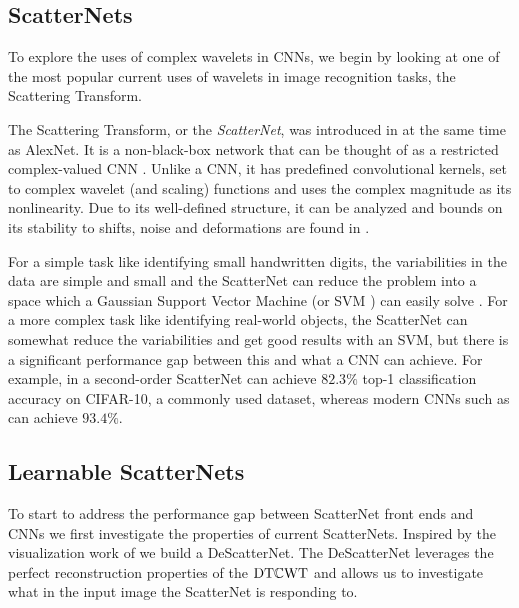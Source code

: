 \subsection{ScatterNets}
To explore the uses of complex wavelets in CNNs, we begin by looking at one of the most
popular current uses of wavelets in image recognition tasks, the
Scattering Transform.

The Scattering Transform, or the \emph{ScatterNet}, was introduced in \cite{mallat_group_2012,
bruna_invariant_2013} at the same time as AlexNet. It is a non-black-box
network that can be thought of as a restricted complex-valued CNN
\cite{tygert_mathematical_2016}. Unlike a CNN, it has predefined
convolutional kernels, set to complex wavelet (and scaling) functions and uses
the complex magnitude as its nonlinearity. Due to
its well-defined structure, it can be analyzed and bounds on its stability to
shifts, noise and deformations are found in \cite{mallat_group_2012}.
%

For a simple task like identifying small handwritten digits,
the variabilities in the data are simple and small and the ScatterNet can 
reduce the problem into a space which a Gaussian Support Vector Machine (or SVM
\cite{cortes_support-vector_1995}) can easily solve
\cite{bruna_invariant_2013}. For a more complex task like identifying real-world
objects, the ScatterNet can somewhat reduce the variabilities and get good
results with an SVM, but there is a significant performance gap between this and
what a CNN can achieve. For example, in \cite{oyallon_deep_2015} a second-order
ScatterNet can achieve $82.3\%$ top-1 classification accuracy on CIFAR-10, a
commonly used dataset, whereas modern CNNs such as \cite{he_deep_2016} can
achieve $93.4\%$.

\subsection{Learnable ScatterNets}
To start to address the performance gap between ScatterNet front ends and CNNs
we first investigate the properties of current ScatterNets. Inspired by the
visualization work of \citeauthor{zeiler_visualizing_2014}
\cite{zeiler_visualizing_2014} we build a DeScatterNet. The DeScatterNet
leverages the perfect reconstruction properties of the $\mathrm{DT}\mathbb{C}\mathrm{WT}$ and allows us to
investigate what in the input image the ScatterNet is responding to.

